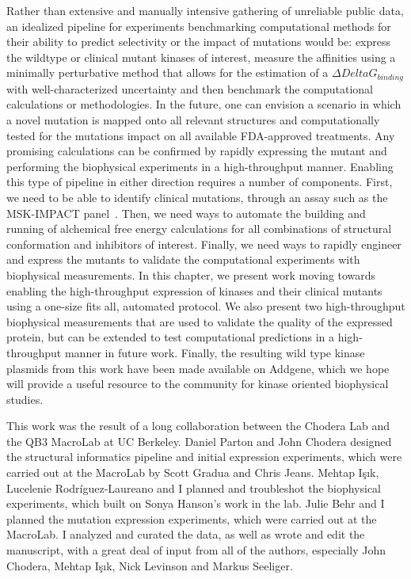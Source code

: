 \documentclass[phd,tocprelim]{cornell}
\begin{document}
Rather than extensive and manually intensive gathering of unreliable public data, an idealized pipeline for experiments benchmarking computational methods for their ability to predict selectivity or the impact of mutations would be: express the wildtype or clinical mutant kinases of interest, measure the affinities using a minimally perturbative method that allows for the estimation of a $\Delta Delta G_{binding}$ with well-characterized uncertainty and then benchmark the computational calculations or methodologies. In the future, one can envision a scenario in which a novel mutation is mapped onto all relevant structures and computationally tested for the mutations impact on all available FDA-approved treatments. Any promising calculations can be confirmed by rapidly expressing the mutant and performing the biophysical experiments in a high-throughput manner. Enabling this type of pipeline in either direction requires a number of components. First, we need to be able to identify clinical mutations, through an assay such as the MSK-IMPACT panel~\citep{Zehir:2017ib}. Then, we need ways to automate the building and running of alchemical free energy calculations for all combinations of structural conformation and inhibitors of interest. Finally, we need ways to rapidly engineer and express the mutants to validate the computational experiments with biophysical measurements. In this chapter, we present work moving towards enabling the high-throughput expression of kinases and their clinical mutants using a one-size fits all, automated protocol. We also present two high-throughput biophysical measurements that are used to validate the quality of the expressed protein, but can be extended to test computational predictions in a high-throughput manner in future work. Finally, the resulting wild type kinase plasmids from this work have been made available on Addgene, which we hope will provide a useful resource to the community for kinase oriented biophysical studies. 

This work was the result of a long collaboration between the Chodera Lab and the QB3 MacroLab at UC Berkeley. Daniel Parton and John Chodera designed the structural informatics pipeline and initial expression experiments, which were carried out at the MacroLab by Scott Gradua and Chris Jeans. Mehtap Işık, Lucelenie Rodr\'{i}guez-Laureano and I planned and troubleshot the biophysical experiments, which built on Sonya Hanson's work in the lab. Julie Behr and I planned the mutation expression experiments, which were carried out at the MacroLab. I analyzed and curated the data, as well as wrote and edit the manuscript, with a great deal of input from all of the authors, especially John Chodera, Mehtap Işık, Nick Levinson and Markus Seeliger. 
\end{document}
